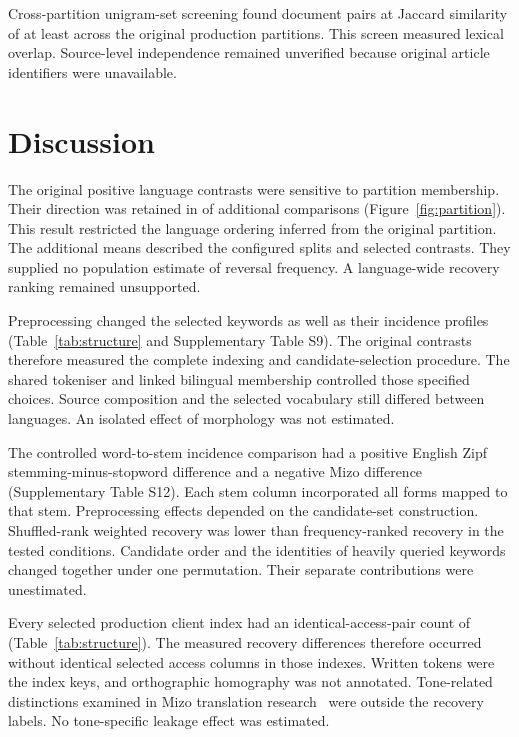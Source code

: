 \documentclass[12pt]{article}
\begin{document}
Cross-partition unigram-set screening found \NearDuplicatePairs{} document pairs at Jaccard similarity of at least \NearDuplicateThreshold{} across the original production partitions. This screen measured lexical overlap. Source-level independence remained unverified because original article identifiers were unavailable.

\section{Discussion}
The original positive language contrasts were sensitive to partition membership. Their direction was retained in \SensitivityPositiveDirections{} of \SensitivityDirectionCount{} additional comparisons (Figure~\ref{fig:partition}). This result restricted the language ordering inferred from the original partition. The additional means described the configured splits and selected contrasts. They supplied no population estimate of reversal frequency. A language-wide recovery ranking remained unsupported.

Preprocessing changed the selected keywords as well as their incidence profiles (Table~\ref{tab:structure} and Supplementary Table S9). The original contrasts therefore measured the complete indexing and candidate-selection procedure. The shared tokeniser and linked bilingual membership controlled those specified choices. Source composition and the selected vocabulary still differed between languages. An isolated effect of morphology was not estimated.

The controlled word-to-stem incidence comparison had a positive English Zipf stemming-minus-stopword difference and a negative Mizo difference (Supplementary Table S12). Each stem column incorporated all forms mapped to that stem. Preprocessing effects depended on the candidate-set construction. Shuffled-rank weighted recovery was lower than frequency-ranked recovery in the tested conditions. Candidate order and the identities of heavily queried keywords changed together under one permutation. Their separate contributions were unestimated.

Every selected production client index had an identical-access-pair count of \IdenticalPairs{} (Table~\ref{tab:structure}). The measured recovery differences therefore occurred without identical selected access columns in those indexes. Written tokens were the index keys, and orthographic homography was not annotated. Tone-related distinctions examined in Mizo translation research~\cite{mizotone} were outside the recovery labels. No tone-specific leakage effect was estimated.
\end{document}
